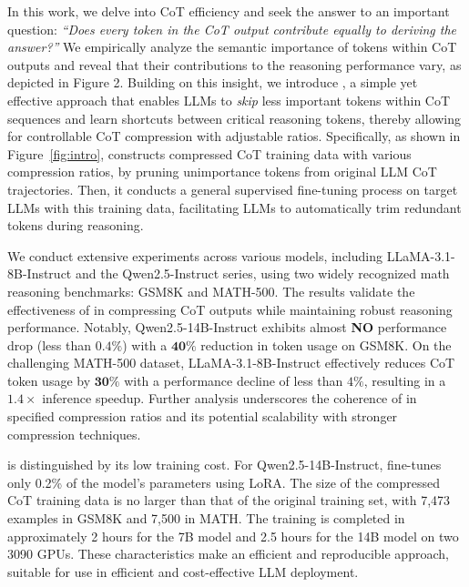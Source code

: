 In this work, we delve into CoT efficiency and seek the answer to an important question: \textit{``Does every token in the CoT output contribute equally to deriving the answer?''} We empirically analyze the semantic importance of tokens within CoT outputs and reveal that their contributions to the reasoning performance vary, as depicted in Figure 2. Building on this insight, we introduce \method, a simple yet effective approach that enables LLMs to \textit{skip} less important tokens within CoT sequences and learn shortcuts between critical reasoning tokens, thereby allowing for controllable CoT compression with adjustable ratios. Specifically, as shown in Figure~\ref{fig:intro}, \method constructs compressed CoT training data with various compression ratios, by pruning unimportance tokens from original LLM CoT trajectories. Then, it conducts a general supervised fine-tuning process on target LLMs with this training data, facilitating LLMs to automatically trim redundant tokens during reasoning.

We conduct extensive experiments across various models, including LLaMA-3.1-8B-Instruct and the Qwen2.5-Instruct series, using two widely recognized math reasoning benchmarks: GSM8K and MATH-500. The results validate the effectiveness of \method in compressing CoT outputs while maintaining robust reasoning performance. Notably, Qwen2.5-14B-Instruct exhibits almost \textbf{NO} performance drop (less than $0.4\%$) with a $\bm{40\%}$ reduction in token usage on GSM8K. On the challenging MATH-500 dataset, LLaMA-3.1-8B-Instruct effectively reduces CoT token usage by $\bm{30}\%$ with a performance decline of less than $4\%$, resulting in a $\bm{1.4}\times$ inference speedup. Further analysis underscores the coherence of \method in specified compression ratios and its potential scalability with stronger compression techniques.

\method is distinguished by its low training cost. For Qwen2.5-14B-Instruct, \method fine-tunes only 0.2\% of the model's parameters using LoRA. The size of the compressed CoT training data is no larger than that of the original training set, with 7,473 examples in GSM8K and 7,500 in MATH. The training is completed in approximately 2 hours for the 7B model and 2.5 hours for the 14B model on two 3090 GPUs. These characteristics make \method an efficient and reproducible approach, suitable for use in efficient and cost-effective LLM deployment.

